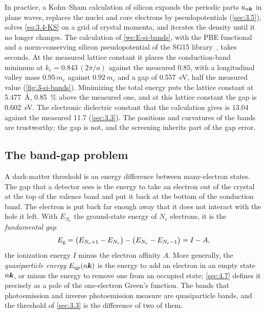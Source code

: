 In practice, a Kohn--Sham calculation of silicon expands the periodic parts $u_{n\bm{k}}$ in plane waves, replaces the nuclei and core electrons by pseudopotentials (\cref{sec:3.5}), solves \cref{eq:3.4-KS} on a grid of crystal momenta, and iterates the density until it no longer changes. The calculation of \cref{we:E-si-bands}, with the PBE functional and a norm-conserving silicon pseudopotential of the SG15 library~\cite{schlipf2015optimization}, takes seconds. At the measured lattice constant it places the conduction-band minimum at $k_{\mathrm{c}} = 0.843\,(2\pi/a)$ against the measured $0.85$, with a longitudinal valley mass $0.95\,m_e$ against $0.92\,m_e$ and a gap of \SI{0.557}{eV}, half the measured value (\cref{fig:3-si-bands}). Minimizing the total energy puts the lattice constant at \SI{5.477}{\angstrom}, \SI{0.85}{\percent} above the measured one, and at this lattice constant the gap is \SI{0.602}{eV}. The electronic dielectric constant that the calculation gives is 13.04 against the measured 11.7 (\cref{sec:3.3}). The positions and curvatures of the bands are trustworthy; the gap is not, and the screening inherits part of the gap error.

\subsection{The band-gap problem}

A dark-matter threshold is an energy difference between many-electron states. The gap that a detector sees is the energy to take an electron out of the crystal at the top of the valence band and put it back at the bottom of the conduction band. The electron is put back far enough away that it does not interact with the hole it left. With $E_{N_e}$ the ground-state energy of $N_e$ electrons, it is the \emph{fundamental gap}
\begin{equation}
  E_{\mathrm{g}} = \bigl(E_{N_e+1} - E_{N_e}\bigr) - \bigl(E_{N_e} - E_{N_e-1}\bigr) = I - A ,
  \label{eq:3.4-fundgap}
\end{equation}
the ionization energy $I$ minus the electron affinity $A$. More generally, the \emph{quasiparticle energy} $E_{\mathrm{qp}}(n\bm{k})$ is the energy to add an electron in an empty state $n\bm{k}$, or minus the energy to remove one from an occupied state; \cref{sec:4.7} defines it precisely as a pole of the one-electron Green's function. The bands that photoemission and inverse photoemission measure are quasiparticle bands, and the threshold of \cref{sec:3.3} is the difference of two of them.

